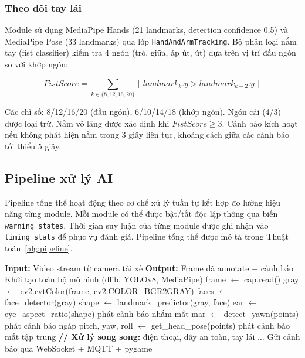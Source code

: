 \subsubsection{Theo dõi tay lái}

Module sử dụng MediaPipe Hands \cite{lugaresi2019} (21 landmarks, detection confidence 0,5) và MediaPipe Pose (33 landmarks) qua lớp {\tt HandAndArmTracking}. Bộ phân loại nắm tay (fist classifier) kiểm tra 4 ngón (trỏ, giữa, áp út, út) dựa trên vị trí đầu ngón so với khớp ngón:

\begin{equation}
FistScore = \sum_{k \in \{8,12,16,20\}} [\,landmark_k.y > landmark_{k-2}.y\,]
\label{eq:fist}
\end{equation}

Các chỉ số: 8/12/16/20 (đầu ngón), 6/10/14/18 (khớp ngón). Ngón cái (4/3) được loại trừ. Nắm vô lăng được xác định khi $FistScore \geq 3$. Cảnh báo kích hoạt nếu không phát hiện nắm trong 3 giây liên tục, khoảng cách giữa các cảnh báo tối thiểu 5 giây.

\subsection{Pipeline xử lý AI}

Pipeline tổng thể hoạt động theo cơ chế xử lý tuần tự kết hợp đo lường hiệu năng từng module. Mỗi module có thể được bật/tắt độc lập thông qua biến {\tt warning\_states}. Thời gian suy luận của từng module được ghi nhận vào {\tt timing\_stats} để phục vụ đánh giá. Pipeline tổng thể được mô tả trong Thuật toán~\ref{alg:pipeline}.

\begin{algorithm}[!ht]
\caption{Pipeline suy luận AI tổng thể}
\label{alg:pipeline}
\fontsize{8}{10}\selectfont
\begin{algorithmic}[1]
\State \textbf{Input:} Video stream từ camera tài xế
\State \textbf{Output:} Frame đã annotate + cảnh báo
\State Khởi tạo toàn bộ mô hình (dlib, YOLOv8, MediaPipe)
    \State frame $\gets$ cap.read()
    \State gray $\gets$ cv2.cvtColor(frame, cv2.COLOR\_BGR2GRAY)
        \State faces $\gets$ face\_detector(gray)
        \State shape $\gets$ landmark\_predictor(gray, face)
        \State ear $\gets$ eye\_aspect\_ratio(shape)
            \State phát cảnh báo nhắm mắt
        \EndIf
    \EndIf
        \State mar $\gets$ detect\_yawn(points)
            \State phát cảnh báo ngáp
        \EndIf
    \EndIf
        \State pitch, yaw, roll $\gets$ get\_head\_pose(points)
            \State phát cảnh báo mất tập trung
        \EndIf
    \EndIf
    \State \textbf{// Xử lý song song:} điện thoại, dây an toàn, tay lái
    \State $\dots$
    \State Gửi cảnh báo qua WebSocket + MQTT + pygame
\EndWhile
\end{algorithmic}
\end{algorithm}

